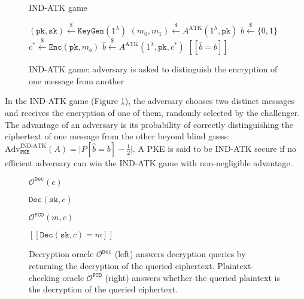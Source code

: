 \documentclass[runningheads]{llncs}
\newcommand{\pke}{\texttt{PKE}}
\newcommand{\keygen}{\texttt{KeyGen}}
\newcommand{\encrypt}{\texttt{Enc}}
\newcommand{\decrypt}{\texttt{Dec}}
\newcommand{\pk}{\texttt{pk}}
\newcommand{\sk}{\texttt{sk}}
\newcommand{\pco}{\texttt{PCO}}
\newcommand{\leftsample}{\stackrel{\$}{\leftarrow}}
\newcommand{\llbrack}{[\![}
\newcommand{\rrbrack}{]\!]}
\begin{document}
\begin{figure}[h]
    \centering
    \begin{minipage}[t]{0.5\textwidth}
        \begin{algorithm}[H]
            \caption*{IND-ATK game}
            \begin{algorithmic}[1]
                \State $(\pk, \sk) \leftsample \keygen(1^\lambda)$
                \State $(m_0, m_1) \leftsample A^\text{ATK}(1^\lambda, \pk)$
                \State $b \leftsample \{0,1\}$
                \State $c^\ast \leftsample \encrypt(\pk, m_b)$
                \State $\hat{b} \leftsample A^\text{ATK}(1^\lambda, \pk, c^\ast)$
                \State \Return $\llbrack \hat{b} = b \rrbrack$
            \end{algorithmic}
        \end{algorithm}
    \end{minipage}
    \caption{IND-ATK game: adversary is asked to distinguish the encryption of one message from another}\label{fig:pke-ind-atk-game}
\end{figure}

In the IND-ATK game (Figure \ref{fig:pke-ind-atk-game}), the adversary chooses two distinct messages and receives the encryption of one of them, randomly selected by the challenger. The advantage of an adversary is its probability of correctly distinguishing the ciphertext of one message from the other beyond blind guess: $\text{Adv}^\text{IND-ATK}_\pke(A) = \vert P[\hat{b} = b] - \frac{1}{2}\vert$. A PKE is said to be IND-ATK secure if no efficient adversary can win the IND-ATK game with non-negligible advantage.

\begin{figure}[h]
    \centering
    \begin{minipage}[t]{0.4\textwidth}
        \begin{algorithm}[H]
            \caption*{$\mathcal{O}^\decrypt(c)$}
            \begin{algorithmic}[1]
                \State \Return $\decrypt(\sk, c)$
            \end{algorithmic}
        \end{algorithm}
    \end{minipage}\hfill
    \begin{minipage}[t]{0.4\textwidth}
        \begin{algorithm}[H]
            \caption*{$\mathcal{O}^\pco(m, c)$}
            \begin{algorithmic}[1]
                \State \Return $\llbrack \decrypt(\sk, c) = m \rrbrack$
            \end{algorithmic}
        \end{algorithm}
    \end{minipage}
    \caption{Decryption oracle $\mathcal{O}^\decrypt$ (left) answers decryption queries by returning the decryption of the queried ciphertext. Plaintext-checking oracle $\mathcal{O}^\pco$ (right) answers whether the queried plaintext is the decryption of the queried ciphertext.}\label{fig:pke-oracles}
\end{figure}
\end{document}
